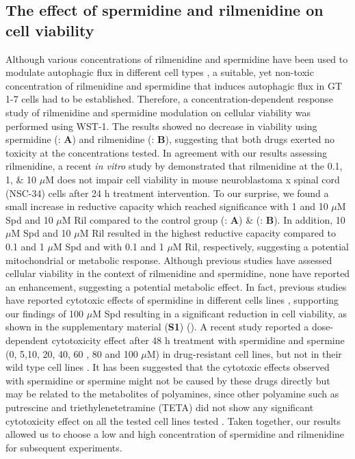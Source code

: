 \subsection{The effect of spermidine and rilmenidine on cell viability}
Although various concentrations of rilmenidine and spermidine have been used to modulate autophagic flux in different cell types \citep{Perera2018,Wang2018}, a suitable, yet non-toxic concentration of rilmenidine and spermidine that induces autophagic flux in GT 1-7 cells had to be established. Therefore, a concentration-dependent response study of rilmenidine and spermidine modulation on cellular viability was performed using WST-1. The results showed no decrease in viability using spermidine (: \textbf{A}) and rilmenidine (: \textbf{B}), suggesting that both drugs exerted no toxicity at the concentrations tested. In agreement with our results assessing rilmenidine,  a recent \textit{in vitro} study by \citet{Perera2018} demonstrated that rilmenidine  at the  0.1, 1, \& 10 $\mu$M does not impair cell viability in mouse neuroblastoma x spinal cord (NSC-34) cells after 24 h treatment intervention. To our surprise, we found a small increase in reductive capacity which reached significance with 1 and 10 $\mu$M Spd and 10 $\mu$M Ril compared to the control group (: \textbf{A})  \& (: \textbf{B}). In addition, 10 $\mu$M Spd and 10 $\mu$M Ril resulted in the highest reductive capacity compared to 0.1 and 1 $\mu$M Spd and with 0.1 and 1 $\mu$M Ril, respectively, suggesting a potential mitochondrial or metabolic response. Although previous studies have assessed cellular viability in the context of rilmenidine and spermidine, none have reported an enhancement, suggesting a potential metabolic effect. In fact, previous studies  have reported cytotoxic effects of spermidine in different cells lines \citep{He1993,Poulin1995,Poulin1993}, supporting our findings of 100 $\mu$M Spd resulting in a significant reduction in cell viability, as shown in the supplementary material (\textbf{S1}) (). A recent study reported a dose-dependent cytotoxicity effect after 48 h treatment with spermidine and spermine (0, 5,10, 20, 40, 60 , 80 and 100 $\mu$M) in drug-resistant cell lines, but not in their wild type cell lines \citep{Wang2018}. It has been suggested that the cytotoxic effects observed with spermidine or spermine might not be caused by these drugs directly but may be related to the metabolites of polyamines, since other polyamine such as putrescine and triethylenetetramine (TETA) did not show any significant cytotoxicity effect on all the tested cell lines tested \citep{Wang2018}. Taken together, our results allowed us to choose a low and high concentration of spermidine and rilmenidine for subsequent experiments.

